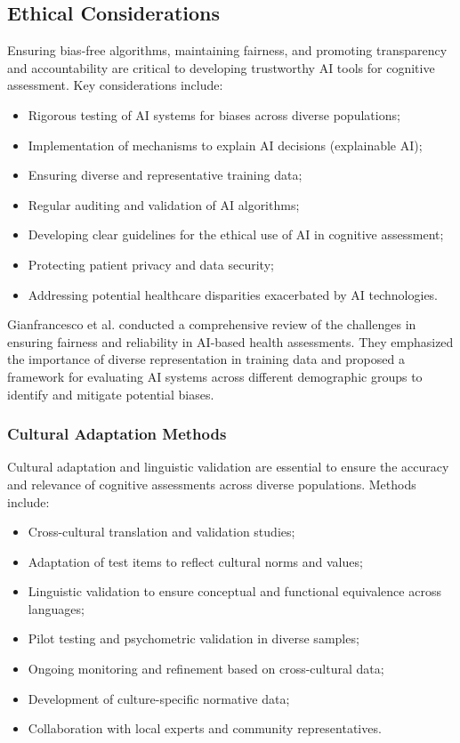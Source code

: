 \subsection{Ethical Considerations}
Ensuring bias-free algorithms, maintaining fairness, and promoting transparency and accountability are critical to developing trustworthy AI tools for cognitive assessment. Key considerations include:
\begin{itemize}
    \item Rigorous testing of AI systems for biases across diverse populations;
    \item Implementation of mechanisms to explain AI decisions (explainable AI);
    \item Ensuring diverse and representative training data;
    \item Regular auditing and validation of AI algorithms;
    \item Developing clear guidelines for the ethical use of AI in cognitive assessment;
    \item Protecting patient privacy and data security;
    \item Addressing potential healthcare disparities exacerbated by AI technologies.
\end{itemize}

Gianfrancesco et al. \cite{Gianfrancesco2018} conducted a comprehensive review of the challenges in ensuring fairness and reliability in AI-based health assessments. They emphasized the importance of diverse representation in training data and proposed a framework for evaluating AI systems across different demographic groups to identify and mitigate potential biases.

\subsubsection{Cultural Adaptation Methods}
Cultural adaptation and linguistic validation are essential to ensure the accuracy and relevance of cognitive assessments across diverse populations. Methods include:
\begin{itemize}
    \item Cross-cultural translation and validation studies;
    \item Adaptation of test items to reflect cultural norms and values;
    \item Linguistic validation to ensure conceptual and functional equivalence across languages;
    \item Pilot testing and psychometric validation in diverse samples;
    \item Ongoing monitoring and refinement based on cross-cultural data;
    \item Development of culture-specific normative data;
    \item Collaboration with local experts and community representatives.
\end{itemize}

